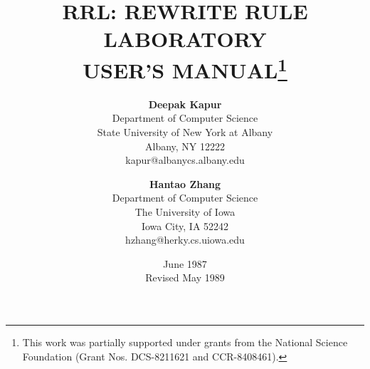 \parskip 5pt
\topmargin -0.3in
\textheight 9in
\textwidth 6.6in
\oddsidemargin=0.0in
\evensidemargin=0.0in
\newcommand{\Grobner}{Gr\"{o}bner\ }
\newcommand{\Groebner}{Gr\"{o}bner\ }
\newcommand{\RRL}{{\sl RRL}\ }
\newcommand{\ERRL}{{\sl RRL}}

\title{\bf RRL:  REWRITE  RULE  LABORATORY
 \\[0.33in] 
USER'S  MANUAL\thanks{This work was partially supported under grants from the
National Science Foundation (Grant Nos. DCS-8211621 and CCR-8408461).
}}
\author{{\bf Deepak Kapur} \\
Department of Computer Science \\
State University of New York at Albany \\
Albany, NY 12222 \\
kapur@albanycs.albany.edu \\
\and
{\bf Hantao Zhang} \\
Department of Computer Science \\
The University of Iowa \\
Iowa City, IA 52242 \\
hzhang@herky.cs.uiowa.edu}

\date{June 1987 \\ Revised May 1989}
\maketitle

